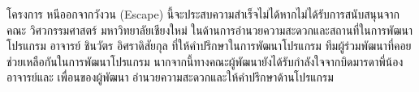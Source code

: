 \iffalse
\begin{dedication}
This document is dedicated to all Chiang Mai University students.

Dedication page is optional.
\end{dedication}
\fi %

\begin{acknowledgments}
โครงการ หนีออกจากวังวน (Escape) 
นี้จะประสบความสำเร็จไม่ได้หากไม่ได้รับการสนับสนุนจาก 
คณะ วิศวกรรมศาสตร์ มหาวิทยาลัยเชียงใหม่ 
ในด้านการอำนวยความสะดวกและสถานที่ในการพัฒนาโปรแกรม 
อาจารย์ ชินวัตร อิศราดิสัยกุล ที่ให้คำปรึกษาในการพัฒนาโปรแกรม 
ทีมผู้ร่วมพัฒนาที่คอยช่วยเหลือกันในการพัฒนาโปรแกรม 
นากจากนี้ทางคณะผู้พัฒนายังได้รับกำลังใจจากบิดมารดาพี่น้องอาจารย์และ
เพื่อนของผู้พัฒนา อำนวยความสะดวกและให้คำปรึกษาด้านโปรแกรม 

\end{acknowledgments}%
\fi %

\contentspage

\ifproject
\figurelistpage

\tablelistpage
\fi %



